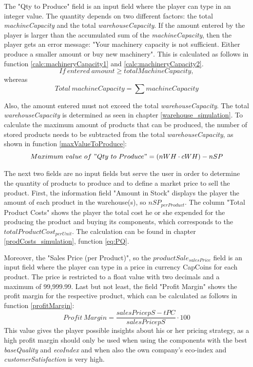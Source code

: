 The "Qty to Produce" field is an input field where the player can type in an integer value. The quantity depends on two different factors: the total \textit{machineCapacity} and the total \textit{warehouseCapacity}. If the amount entered by the player is larger than the accumulated sum of the \textit{machineCapacity}, then the player gets an error message: "Your machinery capacity is not sufficient. Either produce a smaller amount or buy new machinery". This is calculated as follows in function \ref{calc:machineryCapacity1} and \ref{calc:machineryCapacity2}.
\begin{equation}
\label{calc:machineryCapacity1}
   If~entered~amount \geq totalMachineCapacity, 
\end{equation}
whereas 
\begin{equation}
\label{calc:machineryCapacity2}
    Total~machineCapacity = \sum machineCapacity
\end{equation}

Also, the amount entered must not exceed the total \textit{warehouseCapacity}. The total \textit{warehouseCapacity} is determined as seen in chapter \ref{warehouse_simulation}. To calculate the maximum amount of products that can be produced, the number of stored products needs to be subtracted from the total \textit{warehouseCapacity}, as shown in function \ref{maxValueToProduce}:
\begin{equation}
\label{maxValueToProduce}
    Maximum~value~of~"Qty~to~Produce" = (nWH \cdot cWH) - nSP
\end{equation}

The next two fields are no input fields but serve the user in order to determine the quantity of products to produce and to define a market price to sell the product. First, the information field "Amount in Stock" displays the player the amount of each product in the warehouse(s), so $nSP_{per Product}$. The column "Total Product Costs" shows the player the total cost he or she expended for the producing the product and buying its components, which corresponds to the 
$totalProductCost_{perUnit}$. The calculation can be found in chapter \ref{prodCosts_simulation}, function \ref{eq:PQ}.

Moreover, the "Sales Price (per Product)", so the $productSale_{salesPrice}$ field is an input field where the player can type in a price in currency CapCoins for each product. The price is restricted to a float value with two decimals and a maximum of 99,999.99.
Last but not least, the field "Profit Margin" shows the profit margin for the respective product, which can be calculated as follows in function \ref{profitMargin}:
\begin{equation}
\label{profitMargin}
    Profit~Margin = \frac{salesPrice{pS} - tPC}{salesPrice{pS}} \cdot 100
\end{equation}
This value gives the player possible insights about his or her pricing strategy, as a high profit margin should only be used when using the components with the best \textit{baseQuality} and \textit{ecoIndex} and when also the own company's eco-index and \textit{customerSatisfaction} is very high.

